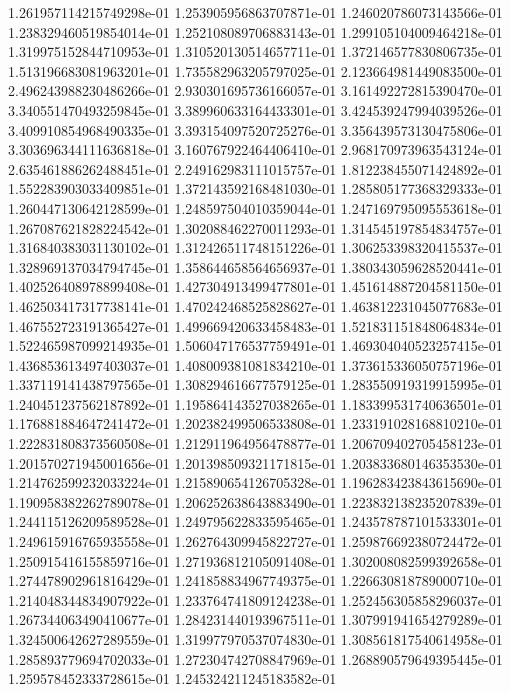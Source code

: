 1.261957114215749298e-01
1.253905956863707871e-01
1.246020786073143566e-01
1.238329460519854014e-01
1.252108089706883143e-01
1.299105104009464218e-01
1.319975152844710953e-01
1.310520130514657711e-01
1.372146577830806735e-01
1.513196683081963201e-01
1.735582963205797025e-01
2.123664981449083500e-01
2.496243988230486266e-01
2.930301695736166057e-01
3.161492272815390470e-01
3.340551470493259845e-01
3.389960633164433301e-01
3.424539247994039526e-01
3.409910854968490335e-01
3.393154097520725276e-01
3.356439573130475806e-01
3.303696344111636818e-01
3.160767922464406410e-01
2.968170973963543124e-01
2.635461886262488451e-01
2.249162983111015757e-01
1.812238455071424892e-01
1.552283903033409851e-01
1.372143592168481030e-01
1.285805177368329333e-01
1.260447130642128599e-01
1.248597504010359044e-01
1.247169795095553618e-01
1.267087621828224542e-01
1.302088462270011293e-01
1.314545197854834757e-01
1.316840383031130102e-01
1.312426511748151226e-01
1.306253398320415537e-01
1.328969137034794745e-01
1.358644658564656937e-01
1.380343059628520441e-01
1.402526408978899408e-01
1.427304913499477801e-01
1.451614887204581150e-01
1.462503417317738141e-01
1.470242468525828627e-01
1.463812231045077683e-01
1.467552723191365427e-01
1.499669420633458483e-01
1.521831151848064834e-01
1.522465987099214935e-01
1.506047176537759491e-01
1.469304040523257415e-01
1.436853613497403037e-01
1.408009381081834210e-01
1.373615336050757196e-01
1.337119141438797565e-01
1.308294616677579125e-01
1.283550919319915995e-01
1.240451237562187892e-01
1.195864143527038265e-01
1.183399531740636501e-01
1.176881884647241472e-01
1.202382499506533808e-01
1.233191028168810210e-01
1.222831808373560508e-01
1.212911964956478877e-01
1.206709402705458123e-01
1.201570271945001656e-01
1.201398509321171815e-01
1.203833680146353530e-01
1.214762599232033224e-01
1.215890654126705328e-01
1.196283423843615690e-01
1.190958382262789078e-01
1.206252638643883490e-01
1.223832138235207839e-01
1.244115126209589528e-01
1.249795622833595465e-01
1.243578787101533301e-01
1.249615916765935558e-01
1.262764309945822727e-01
1.259876692380724472e-01
1.250915416155859716e-01
1.271936812105091408e-01
1.302008082599392658e-01
1.274478902961816429e-01
1.241858834967749375e-01
1.226630818789000710e-01
1.214048344834907922e-01
1.233764741809124238e-01
1.252456305858296037e-01
1.267344063490410677e-01
1.284231440193967511e-01
1.307991941654279289e-01
1.324500642627289559e-01
1.319977970537074830e-01
1.308561817540614958e-01
1.285893779694702033e-01
1.272304742708847969e-01
1.268890579649395445e-01
1.259578452333728615e-01
1.245324211245183582e-01
